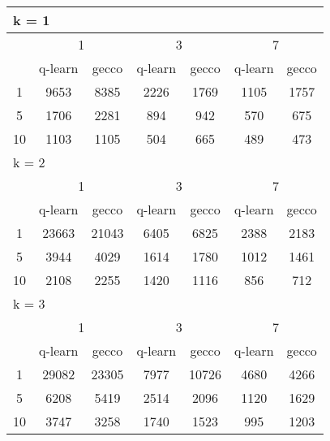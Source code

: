 \begin{table}
 \begin{tabular}{|*7{c|}}
\hline
\multicolumn{7}{|l|}{k = 1} \\
\hline
\multirow{2}{*}{\diagbox{$\mu$}{$\lambda$}} & \multicolumn{2}{c|}{1} & \multicolumn{2}{c|}{3} & \multicolumn{2}{c|}{7} \\
\cline{2-7}
 & q-learn & gecco & q-learn & gecco & q-learn & gecco \\
\hline
1 & 9653 & 8385 & 2226 & 1769 & 1105 & 1757 \\
\hline
5 & 1706 & 2281 & 894 & 942 & 570 & 675 \\
\hline
10 & 1103 & 1105 & 504 & 665 & 489 & 473 \\
\hline
\multicolumn{7}{|l|}{k = 2} \\
\hline
\multirow{2}{*}{\diagbox{$\mu$}{$\lambda$}} & \multicolumn{2}{c|}{1} & \multicolumn{2}{c|}{3} & \multicolumn{2}{c|}{7} \\
\cline{2-7}
 & q-learn & gecco & q-learn & gecco & q-learn & gecco \\
\hline
1 & 23663 & 21043 & 6405 & 6825 & 2388 & 2183 \\
\hline
5 & 3944 & 4029 & 1614 & 1780 & 1012 & 1461 \\
\hline
10 & 2108 & 2255 & 1420 & 1116 & 856 & 712 \\
\hline
\multicolumn{7}{|l|}{k = 3} \\
\hline
\multirow{2}{*}{\diagbox{$\mu$}{$\lambda$}} & \multicolumn{2}{c|}{1} & \multicolumn{2}{c|}{3} & \multicolumn{2}{c|}{7} \\
\cline{2-7}
 & q-learn & gecco & q-learn & gecco & q-learn & gecco \\
\hline
1 & 29082 & 23305 & 7977 & 10726 & 4680 & 4266 \\
\hline
5 & 6208 & 5419 & 2514 & 2096 & 1120 & 1629 \\
\hline
10 & 3747 & 3258 & 1740 & 1523 & 995 & 1203 \\
\hline
\end{tabular}
\end{table}

